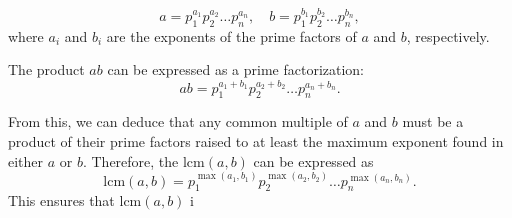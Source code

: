         \[ a = p_1^{a_1} p_2^{a_2} \ldots p_n^{a_n}, \quad b = p_1^{b_1} p_2^{b_2} \ldots p_n^{b_n}, \]
        where \(a_i\) and \(b_i\) are the exponents of the prime factors of \(a\) and \(b\), respectively.

        The product \(ab\) can be expressed as a prime factorization:
        \[ ab = p_1^{a_1+b_1} p_2^{a_2+b_2} \ldots p_n^{a_n+b_n}. \]

        From this, we can deduce that any common multiple of \(a\) and \(b\) must be a product of their prime factors raised to at least the maximum exponent found in either \(a\) or \(b\). Therefore, the \(\text{lcm}(a, b)\) can be expressed as
        \[ \text{lcm}(a, b) = p_1^{\max(a_1,b_1)} p_2^{\max(a_2,b_2)} \ldots p_n^{\max(a_n,b_n)}. \]
        This ensures that \(\text{lcm}(a, b)\) i